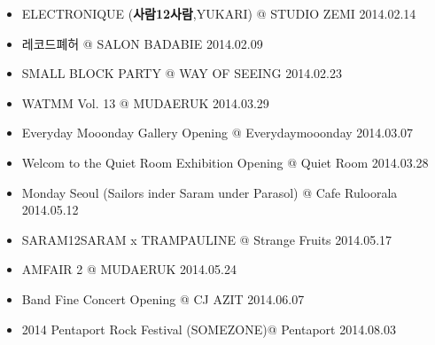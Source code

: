 \begin{itemize}
\item ELECTRONIQUE (\textbf{사람12사람},YUKARI) @ STUDIO ZEMI \hfill 2014.02.14
\item 레코드폐허 @ SALON BADABIE \hfill 2014.02.09
\item SMALL BLOCK PARTY @ WAY OF SEEING \hfill 2014.02.23
\item WATMM Vol. 13 @ MUDAERUK \hfill 2014.03.29
\item Everyday Mooonday Gallery Opening @ Everydaymooonday \hfill 2014.03.07
\item Welcom to the Quiet Room Exhibition Opening @ Quiet Room \hfill 2014.03.28
\item Monday Seoul (Sailors inder Saram under Parasol) @ Cafe Ruloorala \hfill 2014.05.12
\item SARAM12SARAM x TRAMPAULINE @ Strange Fruits \hfill 2014.05.17
\item AMFAIR 2 @ MUDAERUK \hfill 2014.05.24
\item Band Fine Concert Opening @ CJ AZIT \hfill 2014.06.07
\item 2014 Pentaport Rock Festival (SOMEZONE)@ Pentaport \hfill 2014.08.03
\end{itemize}

